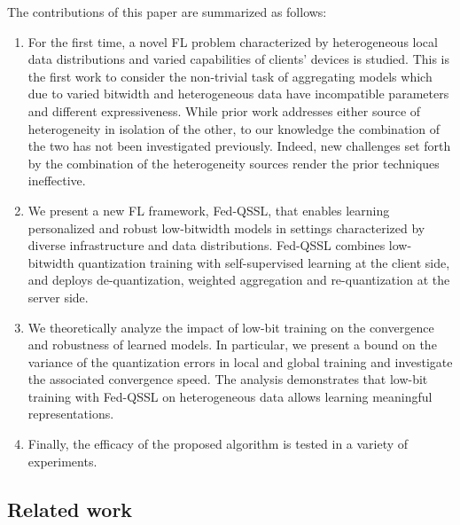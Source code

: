 The contributions of this paper are summarized as follows:

\begin{enumerate}

\item For the first time, a novel FL problem characterized by heterogeneous local data distributions and varied capabilities of clients' devices is studied.
This is the first work to consider the non-trivial task of aggregating models which due to varied bitwidth and heterogeneous data have incompatible parameters and different expressiveness.
While prior work addresses either source of heterogeneity in isolation of the other, to our knowledge the combination of the two has not been investigated previously. Indeed, new challenges set forth by the combination of the heterogeneity sources render the prior techniques ineffective.

\item We present a new FL framework, Fed-QSSL, that enables learning personalized and robust low-bitwidth models in settings characterized by diverse infrastructure and data distributions. Fed-QSSL combines low-bitwidth quantization training with self-supervised 
learning at the client side, and deploys de-quantization, weighted aggregation and re-quantization at the 
server side.

\item We theoretically analyze the impact of low-bit training on the convergence and robustness of learned
models. In particular, we present a bound on the variance of the quantization errors in local and global training and investigate the associated convergence speed. The analysis demonstrates that low-bit training with 
Fed-QSSL on heterogeneous data allows learning meaningful representations. 

\item Finally, the efficacy of the proposed algorithm is tested in a variety of experiments.

\end{enumerate}

\subsection{Related work}

